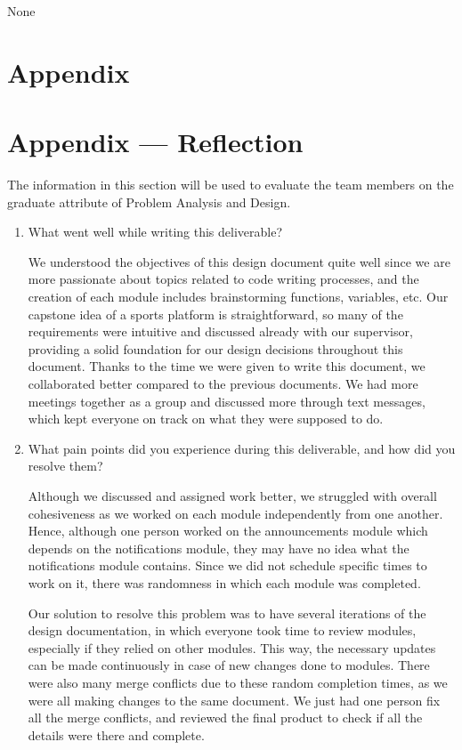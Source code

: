 \documentclass[12pt, titlepage]{article}
\begin{document}
None

\section{Appendix} \label{Appendix}

\newpage{}

\section*{Appendix --- Reflection}

The information in this section will be used to evaluate the team members on the
graduate attribute of Problem Analysis and Design.



\begin{enumerate}
  \item What went well while writing this deliverable?
  
  We understood the objectives of this design document quite well since we are more passionate about topics related to code writing processes, and the creation of each module includes brainstorming functions, variables, etc. Our capstone idea of a sports platform is straightforward, so many of the requirements were intuitive and discussed already with our supervisor, providing a solid foundation for our design decisions throughout this document. Thanks to the time we were given to write this document, we collaborated better compared to the previous documents. We had more meetings together as a group and discussed more through text messages, which kept everyone on track on what they were supposed to do.
  
  \item What pain points did you experience during this deliverable, and how
        did you resolve them?

  Although we discussed and assigned work better, we struggled with overall cohesiveness as we worked on each module independently from one another. Hence, although one person worked on the announcements module which depends on the notifications module, they may have no idea what the notifications module contains. Since we did not schedule specific times to work on it, there was randomness in which each module was completed. 
  
  Our solution to resolve this problem was to have several iterations of the design documentation, in which everyone took time to review modules, especially if they relied on other modules. This way, the necessary updates can be made continuously in case of new changes done to modules. There were also many merge conflicts due to these random completion times, as we were all making changes to the same document. We just had one person fix all the merge conflicts, and reviewed the final product to check if all the details were there and complete.


\end{enumerate}
\end{document}
